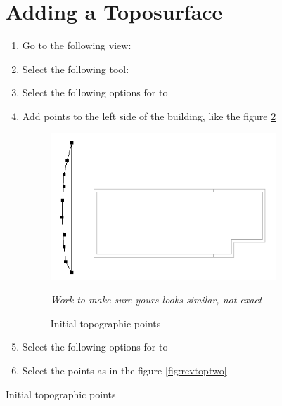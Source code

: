 \documentclass{tufte-book} %
\begin{document}
\begin{figure}
\section{Adding a Toposurface}
\begin{enumerate}
	\item Go to the following view: 
	\item Select the following tool: 
	\item Select the following options for  to 
	\item Add points to the left side of the building, like the figure \ref{fig:revtopoinit}

	\begin{figure}
		\includegraphics[width=\linewidth]{revittopographicinitial.png}
		\caption{Initial topographic points}
		\emph{Work to make sure yours looks similar, not exact}
		\label{fig:revtopoinit}
	\end{figure}

	\item Select the following options for  to 
	\item Select the points as in the figure \ref{fig:revtoptwo}


\end{enumerate}
\end{figure}
\end{document}
